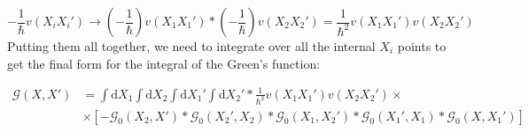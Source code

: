 \begin{equation} \label{eq:49}
- \frac{1}{\hbar} v \left( X_{i} X_{i}' \right)
\to
\left( - \frac{1}{\hbar} \right) v \left( X_{1} X_{1}' \right)
*
\left( - \frac{1}{\hbar} \right) v \left( X_{2} X_{2}' \right)
=
\frac{1}{\hbar^{2}} v \left( X_{1} X_{1}' \right) v \left( X_{2} X_{2}' \right)
\end{equation}
Putting them all together, we need to integrate over all the internal $X_{i}$ points to get the final form for the integral of the Green's function:

\begin{align} \label{eq:50}
\mathcal{G} \left( X, X' \right)
&=
\int \text{d}X_{1} \int \text{d}X_{2} \int \text{d}X_{1}' \int \text{d}X_{2}'
*
\frac{1}{\hbar^{2}} v \left( X_{1} X_{1}' \right) v \left( X_{2} X_{2}' \right)
\times \nonumber \\
&\times
\left[
- \mathcal{G}_{0} \left( X_{2}, X' \right)
*
\mathcal{G}_{0} \left( X_{2}', X_{2} \right)
*
\mathcal{G}_{0} \left( X_{1}, X_{2}' \right)
*
\mathcal{G}_{0} \left( X_{1}', X_{1} \right)
*
\mathcal{G}_{0} \left( X, X_{1}' \right)
\right]
\end{align}